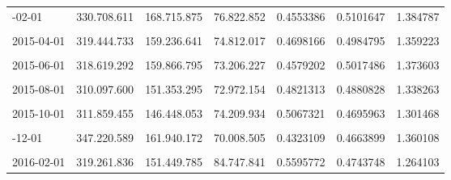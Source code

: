 \documentclass[12pt]{article}
\begin{document}
\begin{longtable}[t]{llllrrr}
\addlinespace
2015-02-01 & 330.708.611 & 168.715.875 & 76.822.852 & 0.4553386 & 0.5101647 & 1.384787\\
\cellcolor{gray!10}{2015-03-01} & \cellcolor{gray!10}{327.928.960} & \cellcolor{gray!10}{166.300.293} & \cellcolor{gray!10}{79.027.687} & \cellcolor{gray!10}{0.4752108} & \cellcolor{gray!10}{0.5071229} & \cellcolor{gray!10}{1.362644}\\
2015-04-01 & 319.444.733 & 159.236.641 & 74.812.017 & 0.4698166 & 0.4984795 & 1.359223\\
\cellcolor{gray!10}{2015-05-01} & \cellcolor{gray!10}{318.441.737} & \cellcolor{gray!10}{158.728.623} & \cellcolor{gray!10}{79.800.347} & \cellcolor{gray!10}{0.5027471} & \cellcolor{gray!10}{0.4984542} & \cellcolor{gray!10}{1.329536}\\
2015-06-01 & 318.619.292 & 159.866.795 & 73.206.227 & 0.4579202 & 0.5017486 & 1.373603\\
\addlinespace
\cellcolor{gray!10}{2015-07-01} & \cellcolor{gray!10}{312.043.132} & \cellcolor{gray!10}{151.094.978} & \cellcolor{gray!10}{64.114.690} & \cellcolor{gray!10}{0.4243337} & \cellcolor{gray!10}{0.4842118} & \cellcolor{gray!10}{1.386471}\\
2015-08-01 & 310.097.600 & 151.353.295 & 72.972.154 & 0.4821313 & 0.4880828 & 1.338263\\
\cellcolor{gray!10}{2015-09-01} & \cellcolor{gray!10}{308.941.546} & \cellcolor{gray!10}{149.465.996} & \cellcolor{gray!10}{68.971.906} & \cellcolor{gray!10}{0.4614555} & \cellcolor{gray!10}{0.4838002} & \cellcolor{gray!10}{1.352353}\\
2015-10-01 & 311.859.455 & 146.448.053 & 74.209.934 & 0.5067321 & 0.4695963 & 1.301468\\
\cellcolor{gray!10}{2015-11-01} & \cellcolor{gray!10}{323.866.983} & \cellcolor{gray!10}{155.124.287} & \cellcolor{gray!10}{74.104.158} & \cellcolor{gray!10}{0.4777083} & \cellcolor{gray!10}{0.4789753} & \cellcolor{gray!10}{1.333626}\\
\addlinespace
2015-12-01 & 347.220.589 & 161.940.172 & 70.008.505 & 0.4323109 & 0.4663899 & 1.360108\\
\cellcolor{gray!10}{2016-01-01} & \cellcolor{gray!10}{321.522.785} & \cellcolor{gray!10}{150.475.360} & \cellcolor{gray!10}{69.281.323} & \cellcolor{gray!10}{0.4604164} & \cellcolor{gray!10}{0.4680084} & \cellcolor{gray!10}{1.337846}\\
2016-02-01 & 319.261.836 & 151.449.785 & 84.747.841 & 0.5595772 & 0.4743748 & 1.264103\\

\end{longtable}
\end{document}
